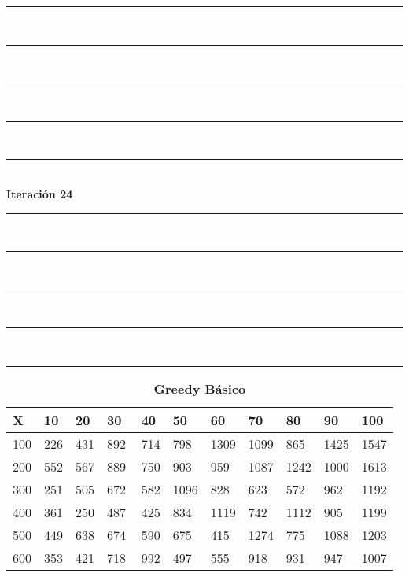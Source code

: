 \documentclass[10pt,letterpaper]{article}
\begin{document}
\newpage 
\begin{center}
\newcommand{\HRule}{\rule{\linewidth}{0.5mm}}
\center
\HRule\\[6cm]
\HRule\\[0.4cm]
\HRule\\[0.4cm]
\HRule\\[0.4cm]
\HRule\\[0.4cm]
{\centering \Huge\bfseries Iteración 24}\\[0.4cm]
\HRule\\[0.4cm]
\HRule\\[0.4cm]
\HRule\\[0.4cm]
\HRule\\[6cm]
\HRule
\end{center}
\newpage 
{}
\begin{center}
\begin{table}\renewcommand{\arraystretch}{2.5}
\caption{\large \textbf{Greedy Básico}}
\centering
\begin{tabular} { |m{0.5cm}|m{1.3cm}|m{1.3cm}|m{1.3cm}|m{1.3cm}|m{1.3cm}|m{1.3cm}|m{1.3cm}|m{1.3cm}|m{1.3cm}|m{1.3cm}|} 
\hline
\rowcolor{Gray}
\centering \textbf{X} & \centering \textbf{10} & \centering \textbf{20} & \centering \textbf{30}\ & \centering \textbf{40} & \centering \textbf{50} & \centering \textbf{60}\ & \centering \textbf{70} & \centering \textbf{80} & \centering \textbf{90}\ & \textbf{100} \\\hline
\cellcolor{Gray}100 & \Large 226 & \Large 431 & \Large 892 & \Large 714 & \Large 798 & \Large 1309 & \Large 1099 & \Large 865 & \Large 1425 & \Large 1547 \\
\hline
\cellcolor{Gray}200 & \Large 552 & \Large 567 & \Large 889 & \Large 750 & \Large 903 & \Large 959 & \Large 1087 & \Large 1242 & \Large 1000 & \Large 1613 \\
\hline
\cellcolor{Gray}300 & \Large 251 & \Large 505 & \Large 672 & \Large 582 & \Large 1096 & \Large 828 & \Large 623 & \Large 572 & \Large 962 & \Large 1192 \\
\hline
\cellcolor{Gray}400 & \Large 361 & \Large 250 & \Large 487 & \Large 425 & \Large 834 & \Large 1119 & \Large 742 & \Large 1112 & \Large 905 & \Large 1199 \\
\hline
\cellcolor{Gray}500 & \Large 449 & \Large 638 & \Large 674 & \Large 590 & \Large 675 & \Large 415 & \Large 1274 & \Large 775 & \Large 1088 & \Large 1203 \\
\hline
\cellcolor{Gray}600 & \Large 353 & \Large 421 & \Large 718 & \Large 992 & \Large 497 & \Large 555 & \Large 918 & \Large 931 & \Large 947 & \Large 1007 \\

\end{tabular}
\end{table}
\end{center}
\end{document}
